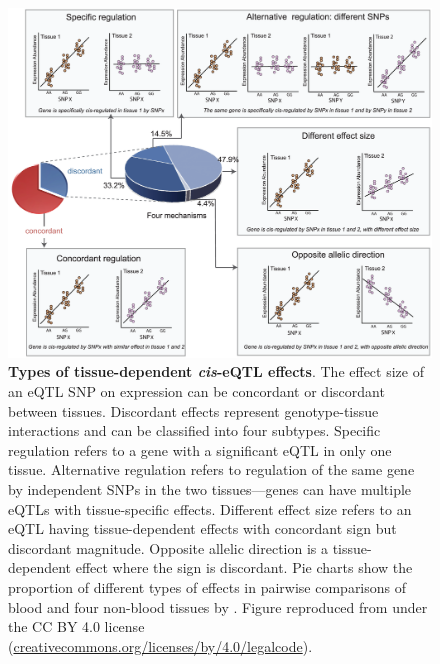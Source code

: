 \begin{figure}
    \centering
    \includegraphics[width=1.0\textwidth,page=1]{mainmatter/figures/chapter_01/fu2012UnravelingRegulatoryMechanisms/journal.pgen.1002431.g002.png}
    \caption[
        .
    ]{
        \textbf{Types of tissue-dependent \textit{cis}-\gls{eQTL} effects}.
        The effect size of an \gls{eQTL} \gls{SNP} on expression can be concordant or discordant between tissues.
        Discordant effects represent genotype-tissue interactions and can be classified into four subtypes.
        Specific regulation refers to a gene with a significant \gls{eQTL} in only one tissue.
        Alternative regulation refers to regulation of the same gene by independent \glspl{SNP} in the two tissues---genes can have multiple \glspl{eQTL} with tissue-specific effects.
        Different effect size refers to an \gls{eQTL} having tissue-dependent effects with concordant sign but discordant magnitude.
        Opposite allelic direction is a tissue-dependent effect where the sign is discordant.
        Pie charts show the proportion of different types of effects in pairwise comparisons of blood and four non-blood tissues by \textcite{fu2012UnravelingRegulatoryMechanisms}.
        Figure reproduced from \textcite{fu2012UnravelingRegulatoryMechanisms} under the CC BY 4.0 license (\url{creativecommons.org/licenses/by/4.0/legalcode}).
    }
    \label{fig:intro_reQTLtypes}
\end{figure}

